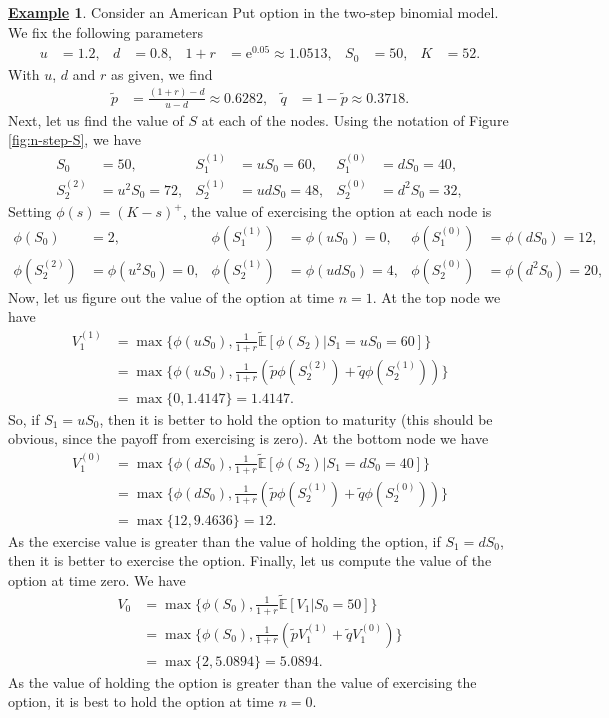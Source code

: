 \documentclass[12pt]{book}
\numberwithin{equation}{chapter}
\theoremstyle{plain}
\numberwithin{theorem}{section}
\theoremstyle{definition}
\newtheorem{example}[theorem]{\underline{Example}}
\numberwithin{exercise}{chapter}
\newcommand{\<}{\langle}
\renewcommand{\>}{\rangle}
\renewcommand{\(}{\left(}
\renewcommand{\)}{\right)}
\renewcommand{\[}{\left[}
\renewcommand{\]}{\right]}
\newcommand\Eb{\mathds{E}}
\newcommand\del{\delta}
\newcommand\Ebt{\widetilde{\Eb}}
\newcommand\qt{\widetilde{q}}
\newcommand\ee{\mathrm{e}}
\theoremstyle{definition}
\numberwithin{question}{section}
\newcommand\pt{\widetilde{p}}
\begin{document}
\begin{example}
\label{ex:american}
Consider an American Put option in the two-step binomial model.  We fix the following parameters
\begin{align}
u &= 1.2, &
d &= 0.8, &
1+r	&= \ee^{0.05} \approx 1.0513, &
S_0
	&=	50 , &
K 
	&= 52 .
\end{align}
With $u$, $d$ and $r$ as given, we find
\begin{align}
\pt
	&=	\frac{(1+r) - d}{u - d} \approx  0.6282 , &
\qt
	&=	1- \pt \approx 0.3718.
\end{align}
Next, let us find the value of $S$ at each of the nodes.  Using the notation of Figure \ref{fig:n-step-S}, we have
\begin{align}
S_0	&=	50, &
S_1^{(1)} &= u S_0 = 60, &
S_1^{(0)} &= d S_0 = 40, \\
S_2^{(2)} &= u^2 S_0 = 72, &
S_2^{(1)} &= u d S_0 = 48, &
S_2^{(0)} &= d^2 S_0 = 32, 
\end{align}
Setting $\phi(s) = (K - s)^+$, the value of exercising the option at each node is
\begin{align}
\phi(S_0)	&=	2 , &
\phi(S_1^{(1)}) &= \phi( u S_0) = 0, &
\phi(S_1^{(0)}) &= \phi(d S_0) = 12, \\
\phi(S_2^{(2)}) &= \phi(u^2 S_0) = 0, &
\phi(S_2^{(1)}) &= \phi(u d S_0) = 4, &
\phi(S_2^{(0)}) &= \phi(d^2 S_0) = 20, 
\end{align}
Now, let us figure out the value of the option at time $n=1$.  At the top node we have
\begin{align}
V_{1}^{(1)}
	&=	\max \{ \phi( u S_0) , \frac{1}{1+r} \Ebt[ \phi(S_{2}) | S_{1} = u S_0 = 60 ] \} \\
	&=	\max \{ \phi( u S_0) , \frac{1}{1+r} \( \pt \phi(S_{2}^{(2)}) + \qt \phi(S_{2}^{(1)})\) \} \\
	&=	\max \{ 0 , 1.4147 \} 
	=		 1.4147 .
\end{align}
So, if $S_{1} = u S_0$, then it is better to hold the option to maturity (this should be obvious, since the payoff from exercising is zero).
At the bottom node we have
\begin{align}
V_{1}^{(0)}
	&=	\max \{ \phi( d S_0) , \frac{1}{1+r} \Ebt[ \phi(S_{2}) | S_{1} = d S_0 = 40 ] \} \\
	&=	\max \{ \phi( d S_0) , \frac{1}{1+r} \( \pt \phi(S_{2}^{(1)}) + \qt \phi(S_{2}^{(0)})\) \} \\
	&=	\max \{ 12 ,  9.4636 \} 
	=		 12 .
\end{align}
As the exercise value is greater than the value of holding the option, if $S_{1} = d S_0$, then it is better to exercise the option.  Finally, let us compute the value of the option at time zero.  We have
\begin{align}
V_0
	&=	\max \{ \phi( S_0) , \frac{1}{1+r} \Ebt[ V_{1} | S_0 = 50 ] \} \\
	&=	\max \{ \phi( S_0) , \frac{1}{1+r} \( \pt V_{1}^{(1)} + \qt V_{1}^{(0)}\) \} \\
	&=	\max \{ 2 ,  5.0894 \} 
	=		5.0894 .
\end{align}
As the value of holding the option is greater than the value of exercising the option, it is best to hold the option at time $n=0$.
\end{example}
\end{document}
